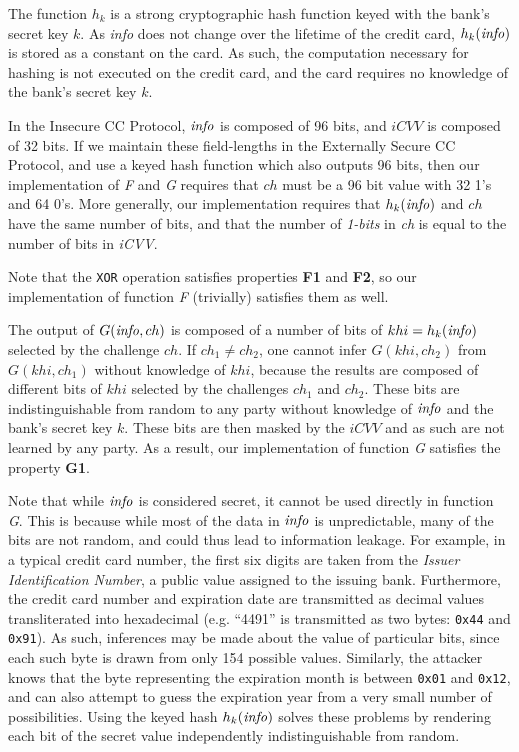 The function $h_k$ is a strong cryptographic hash function keyed with the bank's secret key $k$.
As \emph{info} does not change over the lifetime of the credit card, $h_k(\textrm{\emph{info}})$ is stored as a constant on the card.
As such, the computation necessary for hashing is not executed on the credit card, and the card requires no knowledge of the bank's secret key $k$.

In the Insecure CC Protocol, $\textrm{\emph{info}}$ is composed of 96 bits, and $iCVV$ is composed of 32 bits.
If we maintain these field-lengths in the Externally Secure CC Protocol, and use a keyed hash function which also outputs 96 bits, then our implementation of \emph{F} and \emph{G} requires that $ch$ must be a 96 bit value with 32 1's and 64 0's.
More generally, our implementation requires that $h_k(\textrm{\emph{info}})$ and $ch$ have the same number of bits,
	and that the number of \emph{1-bits} in \emph{ch} is equal to the number of bits in \emph{iCVV}.

Note that the \texttt{XOR} operation satisfies properties \textbf{F1} and \textbf{F2}, so our implementation of function \emph{F} (trivially) satisfies them as well.

The output of $G(\textrm{\emph{info}}, ch)$ is composed of a number of bits of $khi = h_k(\textrm{\emph{info}})$ selected by the challenge $ch$.
If $ch_1 \neq ch_2$, one cannot infer $G(khi, ch_2)$ from $G(khi, ch_1)$ without knowledge of $khi$,
because the results are composed of different bits of $khi$ selected by the challenges $ch_1$ and $ch_2$.
These bits are indistinguishable from random to any party without knowledge of $\textrm{\emph{info}}$ and the bank's secret key $k$.
These bits are then masked by the $iCVV$ and as such are not learned by any party.
As a result, our implementation of function \emph{G} satisfies the property \textbf{G1}.

Note that while $\textrm{\emph{info}}$ is considered secret, it cannot be used directly in function \emph{G}.
This is because while most of the data in $\textrm{\emph{info}}$ is unpredictable, many of the bits are not random, and could thus lead to information leakage.
For example, in a typical credit card number, the first six digits are taken from the \emph{Issuer Identification Number}, a public value assigned to the issuing bank.
Furthermore, the credit card number and expiration date are transmitted as decimal values transliterated into hexadecimal (e.g. ``4491'' is transmitted as two bytes: \texttt{0x44} and \texttt{0x91}).
As such, inferences may be made about the value of particular bits, since each such byte is drawn from only 154 possible values.
Similarly, the attacker knows that the byte representing the expiration month is between \texttt{0x01} and \texttt{0x12}, and can also attempt to guess the expiration year from a very small number of possibilities.
Using the keyed hash $h_k(\textrm{\emph{info}})$ solves these problems by rendering each bit of the secret value independently indistinguishable from random.
